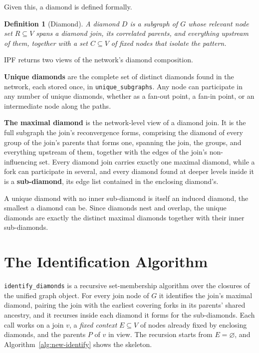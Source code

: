 \documentclass[12pt]{report}
\newtheorem{definition}[theorem]{Definition}
\begin{document}
Given this, a diamond is defined formally.

\begin{definition}[Diamond]
\label{def:diamond}
A diamond $D$ is a subgraph of $G$ whose relevant node set $R \subseteq V$ spans a diamond join, its correlated parents, and everything upstream of them, together with a set $C \subseteq V$ of fixed nodes that isolate the pattern.
\end{definition}

IPF returns two views of the network's diamond composition.

\textbf{Unique diamonds} are the complete set of distinct diamonds found in the network, each stored once, in \texttt{unique\_subgraphs}. Any node can participate in any number of unique diamonds, whether as a fan-out point, a fan-in point, or an intermediate node along the paths.

\textbf{The maximal diamond} is the network-level view of a diamond join. It is the full subgraph the join's reconvergence forms, comprising the diamond of every group of the join's parents that forms one, spanning the join, the groups, and everything upstream of them, together with the edges of the join's non-influencing set. Every diamond join carries exactly one maximal diamond, while a fork can participate in several, and every diamond found at deeper levels inside it is a \textbf{sub-diamond}, its edge list contained in the enclosing diamond's.

A unique diamond with no inner sub-diamond is itself an induced diamond, the smallest a diamond can be. Since diamonds nest and overlap, the unique diamonds are exactly the distinct maximal diamonds together with their inner sub-diamonds.

\section{The Identification Algorithm}
\label{sec:dd-algorithm}

\texttt{identify\_diamonds} is a recursive set-membership algorithm over the closures of the unified graph object. For every join node of $G$ it identifies the join's maximal diamond, pairing the join with the earliest covering forks in its parents' shared ancestry, and it recurses inside each diamond it forms for the sub-diamonds. Each call works on a join $v$, a \emph{fixed context} $E \subseteq V$ of nodes already fixed by enclosing diamonds, and the parents $P$ of $v$ in view. The recursion starts from $E = \varnothing$, and Algorithm~\ref{alg:new-identify} shows the skeleton.
\end{document}
